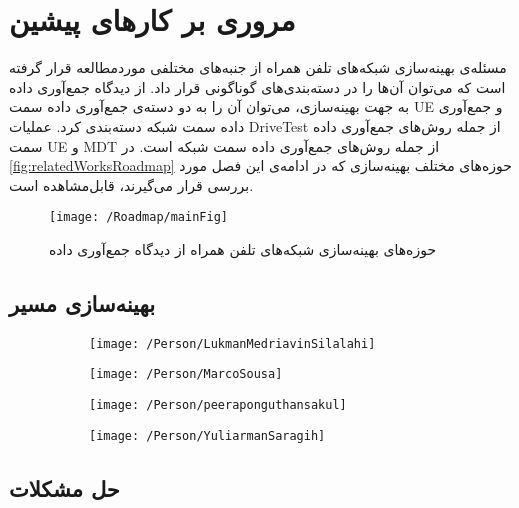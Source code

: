 \chapter{مروری بر کارهای پیشین}
\label{chap:relatedworks}
مسئله‌ی بهینه‌سازی شبکه‌های تلفن همراه از جنبه‌های مختلفی موردمطالعه قرار گرفته است که می‌توان آن‌ها را در دسته‌بندی‌های گوناگونی قرار داد. از دیدگاه جمع‌آوری داده به جهت بهینه‌سازی، می‌توان آن را به دو دسته‌ی جمع‌آوری داده سمت 
\gls{UE} 
و جمع‌آوری داده سمت شبکه دسته‌بندی کرد. عملیات  \gls{DriveTest} از جمله روش‌های جمع‌آوری داده سمت \gls{UE} و \gls{MDT} از جمله روش‌های جمع‌آوری داده سمت شبکه است. در 
\autoref{fig:relatedWorksRoadmap}
حوزه‌های مختلف بهینه‌سازی که در ادامه‌ی این فصل مورد بررسی قرار می‌گیرند، قابل‌مشاهده است. 

\begin{figure}
\texttt{[image: /Roadmap/mainFig]}
\caption{%
حوزه‌های بهینه‌سازی شبکه‌های تلفن همراه از دیدگاه جمع‌آوری داده}
\label{fig:relatedWorksRoadmap}
\end{figure}


\section{بهینه‌سازی مسیر}
\begin{figure}
\begin{subfigure}[b]{.24\textwidth}\centering
\texttt{[image: /Person/LukmanMedriavinSilalahi]}
\caption{}
\end{subfigure} 
\begin{subfigure}[b]{.24\linewidth}\centering
\texttt{[image: /Person/MarcoSousa]}
\caption{}
\end{subfigure}
\begin{subfigure}[b]{.24\linewidth}\centering
\texttt{[image: /Person/peeraponguthansakul]}
\caption{}
\end{subfigure}
\begin{subfigure}[b]{.24\linewidth}\centering
\texttt{[image: /Person/YuliarmanSaragih]}
\caption{}
\end{subfigure}
\end{figure}


\section{حل مشکلات}